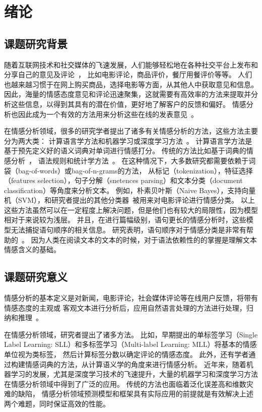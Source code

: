 
\chapter{绪论}

\section{课题研究背景}
随着互联网技术和社交媒体的飞速发展，人们能够轻松地在各种社交平台上发布和分享自己的意见及评论~，
比如电影评论，商品评价，餐厅用餐评价等等。
人们也越来越习惯于在网上购买商品，选择电影等方面，从其他人中获取意见和信息。
因此，海量的情感态度意见和评论迅速聚集，这就需要有高效率的方法来提取并分析这些信息，以得到其具有的潜在价值，更好地了解客户的反馈和偏好。
情感分析也因此成为一个有效的方法用来分析这些在线的发表意见~。

在情感分析领域，很多的研究学者提出了诸多有关情感分析的方法，这些方法主要分为两大类：
计算语言学方法和机器学习或深度学习方法~。
计算语言学方法是基于预先定义好的语义词典对单词进行情感打分。
传统的方法比如基于词典的情感分析~，
语法规则和统计学方法~。
在这种情况下，大多数研究都需要依赖于词袋（bag-of-words）或bag-of-n-grams的方法，
从标记（tokenization），特征选择（features selection），句子分解（snetences parsing）和文本分类（document classification）等角度来分析文本。
例如，朴素贝叶斯（Naive Bayes），支持向量机（SVM），和研究者提出的其他分类器~被用来对电影评论进行情感分类。
以上这些方法虽然可以在一定程度上解决问题，但是他们也有较大的局限性，因为模型相对于来说较为浅层。
并且，在进行篇幅级别，语句更长的情感分析时，这些模型无法捕捉语句顺序的相关信息。
研究表明，语句顺序对于情感分类是非常有帮助的~。
因为人类在阅读文本的文本的时候，对于语法依赖性的的掌握是理解文本情感含义的基础。

\section{课题研究意义}
情感分析的基本定义是对新闻，电影评论，社会媒体评论等在线用户反馈，将带有情感态度的主观或
客观文本进行分析后，应用自然语言处理的方法进行处理，归纳和推理~。

在情感分析领域，研究者提出了诸多方法。
比如，早期提出的单标签学习（Single Label Learning: SLL）和多标签学习（Multi-label Learning: MLL）将基本的情感单位视为类标签，
然后计算标签分数以确定评论的情感态度。
此外，还有学者通过构建情感词典的方法，从计算语义学的角度来进行情感分析。
近年来，随着机器学习的发展，尤其是深度学习技术的飞速提升，大量的机器学习和深度学习方法在情感分析领域中得到了广泛的应用。
传统的方法也面临着泛化误差高和维数灾难的缺陷，
情感分析领域预测模型和框架具有实际应用的前提就是有效解决上述两个难题，同时保证高效的性能。


